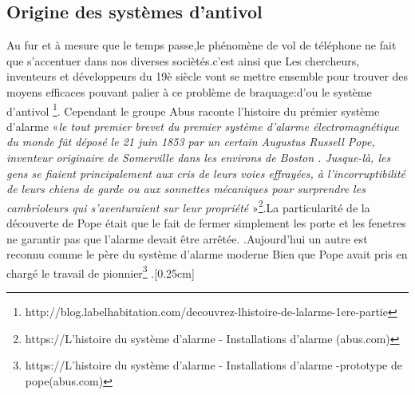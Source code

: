 \documentclass[a4paper, 12pt]{article}
\begin{document}
\subsection{Origine des systèmes d'antivol}

 \quad Au fur et à mesure que le temps passe,le phénomène de vol de téléphone ne fait que s'accentuer dans nos diverses sociètés.c'est ainsi que Les chercheurs, inventeurs et développeurs du 19è siècle vont se mettre ensemble pour trouver des moyens efficaces pouvant palier à ce problème de braquage:d'ou le système d'antivol \footnote{http://blog.labelhabitation.com/decouvrez-lhistoire-de-lalarme-1ere-partie}. Cependant le groupe Abus raconte l'histoire du prémier système d'alarme «\textit{le tout premier brevet du premier système d’alarme électromagnétique du monde fût déposé le 21 juin 1853 par un certain Augustus Russell Pope, inventeur originaire de Somerville dans les environs de Boston . Jusque-là, les gens se fiaient principalement aux cris de leurs voies effrayées, à l’incorruptibilité de leurs chiens de garde ou aux sonnettes mécaniques pour surprendre les cambrioleurs qui s’aventuraient sur leur propriété }»\footnote{https://L’histoire du système d’alarme - Installations d'alarme (abus.com)}.La particularité de la découverte de Pope était que le fait de fermer simplement les porte et les fenetres ne garantir pas que l’alarme devait être arrêtée. .Aujourd’hui un autre est reconnu comme le père du système d’alarme moderne Bien que Pope avait pris en chargé le travail de pionnier\footnote{https://L’histoire du système d’alarme - Installations d'alarme -prototype de pope(abus.com)} .[0.25cm]
\end{document}

